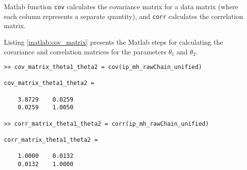 Matlab function \verb+cov+ calculates the covariance matrix for a data matrix (where each column represents a separate quantity), 
and \verb+corr+ calculates the correlation matrix.

Listing \ref{matlab:cov_matrix} presents the Matlab steps for calculating the covariance and correlation matrices for the parameters $\theta_1$ and $\theta_2$.

\newpage

\begin{lstlisting}[label=matlab:ip_cov_matrix,caption={Matlab code for finding covariance and correlation matrices.}]
% inside Matlab
>> cov_matrix_theta1_theta2 = cov(ip_mh_rawChain_unified)

cov_matrix_theta1_theta2 =

    3.8729    0.0259
    0.0259    1.0050
    
>> corr_matrix_theta1_theta2 = corr(ip_mh_rawChain_unified)

corr_matrix_theta1_theta2 =

    1.0000    0.0132
    0.0132    1.0000    
\end{lstlisting}

